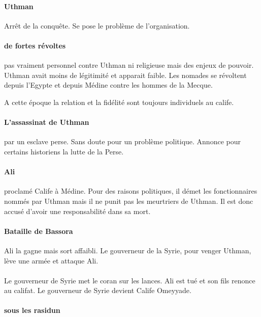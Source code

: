 \paragraph{Uthman} Arrêt de la conquête. Se pose le problème de l'organisation. 

\paragraph{de fortes révoltes} pas vraiment personnel contre Uthman ni religieuse mais des enjeux de pouvoir. Uthman avait moins de légitimité et apparait faible.
Les nomades se révoltent depuis l'Egypte et depuis Médine contre les hommes de la Mecque.  

\begin{Prop}
A cette époque la relation et la fidélité sont toujours individuels au calife. 
\end{Prop}

\paragraph{L'assassinat de Uthman } par un esclave perse. Sans doute pour un problème politique. Annonce pour certains historiens la lutte de la Perse.


\paragraph{Ali} proclamé Calife à Médine. Pour des raisons politiques, il démet les fonctionnaires nommés par Uthman mais il ne punit pas les meurtriers de Uthman. Il est donc accusé d'avoir une responsabilité dans sa mort.

\paragraph{Bataille de Bassora} Ali la gagne mais sort affaibli. Le gouverneur de la Syrie, pour venger Uthman, lève une armée et attaque Ali. 

\paragraph{} Le gouverneur de Syrie met le coran sur les lances. Ali est tué et son fils renonce au califat. Le gouverneur de Syrie devient Calife Omeyyade.


\paragraph{sous les rasidun}


